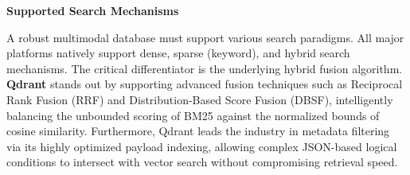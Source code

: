 \begin{table}[H]
    \centering
    \caption{Multi-Vector Storage and MaxSim Implementation.}
    \label{tab:multivector_impl}
\end{table}

\textbf{Supported Search Mechanisms}

A robust multimodal database must support various search paradigms. All major platforms natively support dense, sparse (keyword), and hybrid search mechanisms. The critical differentiator is the underlying hybrid fusion algorithm. \textbf{Qdrant} stands out by supporting advanced fusion techniques such as Reciprocal Rank Fusion (RRF) and Distribution-Based Score Fusion (DBSF), intelligently balancing the unbounded scoring of BM25 against the normalized bounds of cosine similarity. Furthermore, Qdrant leads the industry in metadata filtering via its highly optimized payload indexing, allowing complex JSON-based logical conditions to intersect with vector search without compromising retrieval speed.

\begin{table}[H]
    \centering
    \caption{Search Mechanism Comparison.}
    \label{tab:search_mechanisms}
\end{table}

